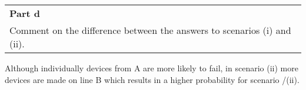 \documentclass[a4paper,12pt]{article}
\begin{document}
\newpage
 \begin{table}[ht!]
     \centering
     \begin{tabular}{|p{15cm}|}
     \hline
     \large
     \smallskip
\noindent \textbf{Part d} \\
\large
 
  Comment on the difference between the answers to scenarios (i) and (ii).\\ 
 \hline
      \end{tabular}
    \end{table}

\noindent Although individually devices from A are more likely to fail, in scenario (ii) more devices
are made on line B which results in a higher probability for scenario /(ii).
\end{document}
